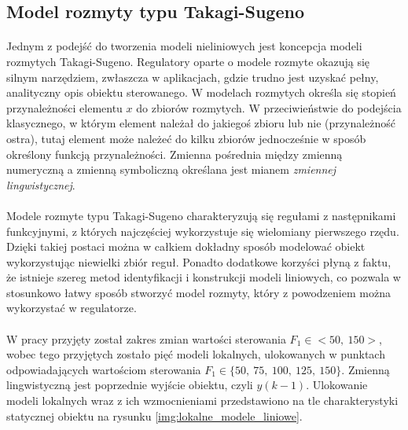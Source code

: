 \documentclass[a4paper,12pt]{article}
\begin{document}
\subsection{Model rozmyty typu Takagi-Sugeno}
\paragraph{}
Jednym z podejść do tworzenia modeli nieliniowych jest koncepcja modeli rozmytych Takagi-Sugeno.
Regulatory oparte o modele rozmyte okazują się silnym narzędziem, zwłaszcza w aplikacjach, gdzie trudno jest uzyskać pełny, analityczny opis obiektu sterowanego.
W modelach rozmytych określa się stopień przynależności elementu $x$ do zbiorów rozmytych.
W przeciwieństwie do podejścia klasycznego, w którym element należał do jakiegoś zbioru lub nie (przynależność ostra), tutaj element może należeć do kilku zbiorów jednocześnie w sposób określony funkcją przynależności.
Zmienna pośrednia między zmienną numeryczną a zmienną symboliczną określana jest mianem \emph{zmiennej lingwistycznej}.

\paragraph{}
Modele rozmyte typu Takagi-Sugeno charakteryzują się regułami z następnikami funkcyjnymi, z których najczęściej wykorzystuje się wielomiany pierwszego rzędu.
Dzięki takiej postaci można w całkiem dokładny sposób modelować obiekt wykorzystując niewielki zbiór reguł.
Ponadto dodatkowe korzyści płyną z faktu, że istnieje szereg metod identyfikacji i konstrukcji modeli liniowych, co pozwala w stosunkowo łatwy sposób stworzyć model rozmyty, który z powodzeniem można wykorzystać w regulatorze.

\paragraph{}
W pracy przyjęty został zakres zmian wartości sterowania $F_1 \in <50,~150>$, wobec tego przyjętych zostało pięć modeli lokalnych, ulokowanych w punktach odpowiadających wartościom sterowania $F_1 \in \lbrace 50,~75,~100,~125,~150 \rbrace$.
Zmienną lingwistyczną jest poprzednie wyjście obiektu, czyli $y(k-1)$.
Ulokowanie modeli lokalnych wraz z ich wzmocnieniami przedstawiono na tle charakterystyki statycznej obiektu na rysunku \ref{img:lokalne_modele_liniowe}.
\end{document}
